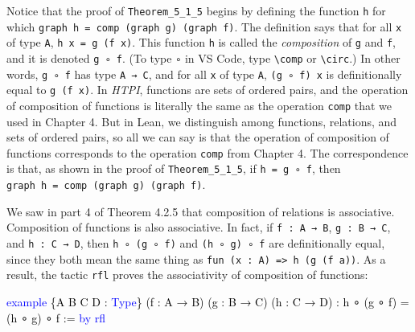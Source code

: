\documentclass[
  letterpaper,
  DIV=11,
  numbers=noendperiod]{scrreprt}
\newenvironment{Shaded}{\begin{snugshade}}{\end{snugshade}}
\newcommand{\KeywordTok}[1]{\textcolor[rgb]{0.00,0.23,0.31}{#1}}
\newcommand{\NormalTok}[1]{\textcolor[rgb]{0.00,0.23,0.31}{#1}}
\renewcommand{\NormalTok}[1]{\textcolor[HTML]{000000}{#1}}
\renewcommand{\KeywordTok}[1]{\textcolor[HTML]{0000FF}{#1}}
\theoremstyle{remark}
\begin{document}
Notice that the proof of \texttt{Theorem\_5\_1\_5} begins by defining
the function \texttt{h} for which
\texttt{graph\ h\ =\ comp\ (graph\ g)\ (graph\ f)}. The definition says
that for all \texttt{x} of type \texttt{A}, \texttt{h\ x\ =\ g\ (f\ x)}.
This function \texttt{h} is called the \emph{composition} of \texttt{g}
and \texttt{f}, and it is denoted \texttt{g\ ∘\ f}. (To type \texttt{∘}
in VS Code, type \texttt{\textbackslash{}comp} or
\texttt{\textbackslash{}circ}.) In other words, \texttt{g\ ∘\ f} has
type \texttt{A\ →\ C}, and for all \texttt{x} of type \texttt{A},
\texttt{(g\ ∘\ f)\ x} is definitionally equal to \texttt{g\ (f\ x)}. In
\emph{HTPI}, functions are sets of ordered pairs, and the operation of
composition of functions is literally the same as the operation
\texttt{comp} that we used in Chapter 4. But in Lean, we distinguish
among functions, relations, and sets of ordered pairs, so all we can say
is that the operation of composition of functions corresponds to the
operation \texttt{comp} from Chapter 4. The correspondence is that, as
shown in the proof of \texttt{Theorem\_5\_1\_5}, if
\texttt{h\ =\ g\ ∘\ f}, then
\texttt{graph\ h\ =\ comp\ (graph\ g)\ (graph\ f)}.

We saw in part 4 of Theorem 4.2.5 that composition of relations is
associative. Composition of functions is also associative. In fact, if
\texttt{f\ :\ A\ →\ B}, \texttt{g\ :\ B\ →\ C}, and
\texttt{h\ :\ C\ →\ D}, then \texttt{h\ ∘\ (g\ ∘\ f)} and
\texttt{(h\ ∘\ g)\ ∘\ f} are definitionally equal, since they both mean
the same thing as
\texttt{fun\ (x\ :\ A)\ =\textgreater{}\ h\ (g\ (f\ a))}. As a result,
the tactic \texttt{rfl} proves the associativity of composition of
functions:

\begin{Shaded}
\begin{Highlighting}[]
\KeywordTok{example}\NormalTok{ \{A B C D : }\KeywordTok{Type}\NormalTok{\} (f : A → B) (g : B → C) (h : C → D) :}
\NormalTok{    h ∘ (g ∘ f) = (h ∘ g) ∘ f := }\KeywordTok{by} \KeywordTok{rfl}
\end{Highlighting}
\end{Shaded}
\end{document}
